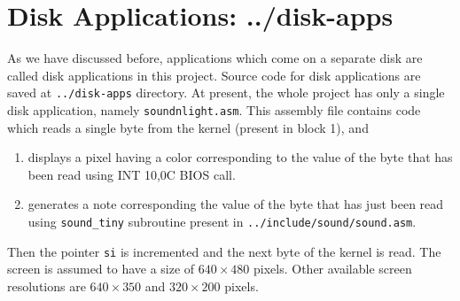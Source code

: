 \section{Disk Applications: ../disk-apps}
As we have discussed before, applications which come on a separate disk are called disk applications in this project. Source code for disk applications are saved at \texttt{../disk-apps} directory. At present, the whole project has only a single disk application, namely \texttt{soundnlight.asm}. This assembly file contains code which reads a single byte from the kernel (present in block 1), and
\begin{enumerate}
  \item displays a pixel having a color corresponding to the value of the byte that has been read using INT 10,0C BIOS call.
  \item generates a note corresponding the value of the byte that has just been read using \texttt{sound\_tiny} subroutine present in \texttt{../include/sound/sound.asm}.
\end{enumerate}
Then the pointer \texttt{si} is incremented and the next byte of the kernel is read. The screen is assumed to have a size of $640\times480$ pixels. Other available screen resolutions are $640\times350$ and $320\times200$ pixels.

